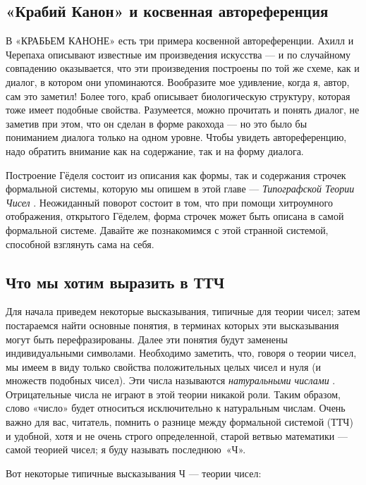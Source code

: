 \documentclass[../main.tex]{subfiles}
\begin{document}

\subsection{«Крабий Канон» и косвенная автореференция}

В «КРАБЬЕМ КАНОНЕ» есть три примера косвенной автореференции. Ахилл и Черепаха описывают известные им произведения искусства --- и по случайному совпадению оказывается, что эти произведения построены по той же схеме, как и диалог, в котором они упоминаются. Вообразите мое удивление, когда я, автор, сам это заметил! Более того, краб описывает биологическую структуру, которая тоже имеет подобные свойства. Разумеется, можно прочитать и понять диалог, не заметив при этом, что он сделан в форме ракохода --- но это было бы пониманием диалога только на одном уровне. Чтобы увидеть автореференцию, надо обратить внимание как на содержание, так и на форму диалога.

Построение Гёделя состоит из описания как формы, так и содержания строчек формальной системы, которую мы опишем в этой главе --- \emph{Типографской Теории Чисел} . Неожиданный поворот состоит в том, что при помощи хитроумного отображения, открытого Гёделем, форма строчек может быть описана в самой формальной системе. Давайте же познакомимся с этой странной системой, способной взглянуть сама на себя.


\subsection{Что мы хотим выразить в ТТЧ}

Для начала приведем некоторые высказывания, типичные для теории чисел; затем постараемся найти основные понятия, в терминах которых эти высказывания могут быть перефразированы. Далее эти понятия будут заменены индивидуальными символами. Необходимо заметить, что, говоря о теории чисел, мы имеем в виду только свойства положительных целых чисел и нуля (и множеств подобных чисел). Эти числа называются \emph{натуральными числами} . Отрицательные числа не играют в этой теории никакой роли. Таким образом, слово «число» будет относиться исключительно к натуральным числам. Очень важно для вас, читатель, помнить о разнице между формальной системой (ТТЧ) и удобной, хотя и не очень строго определенной, старой ветвью математики --- самой теорией чисел; я буду называть последнюю~«Ч».

Вот некоторые типичные высказывания Ч --- теории чисел:
\end{document}

